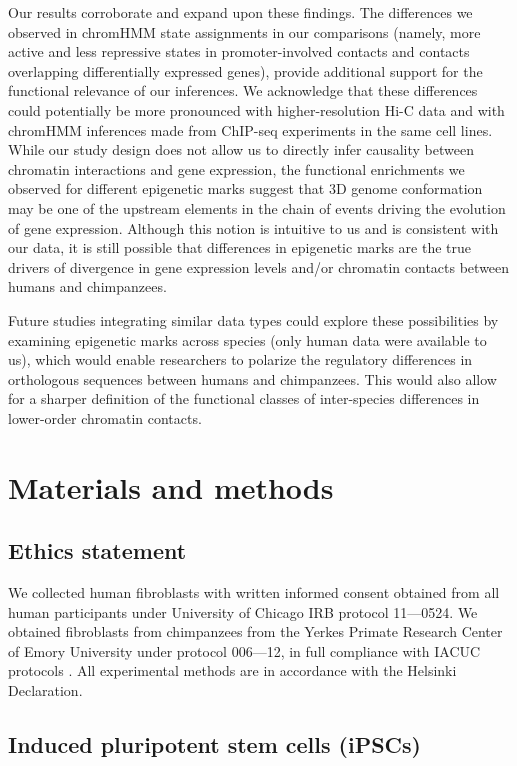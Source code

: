 Our results corroborate and expand upon these findings. The differences we observed in chromHMM state assignments in our comparisons (namely, more active and less repressive states in promoter-involved contacts and contacts overlapping differentially expressed genes), provide additional support for the functional relevance of our inferences. We acknowledge that these differences could potentially be more pronounced with higher-resolution Hi-C data and with chromHMM inferences made from ChIP-seq experiments in the same cell lines. While our study design does not allow us to directly infer causality between chromatin interactions and gene expression, the functional enrichments we observed for different epigenetic marks suggest that 3D genome conformation may be one of the upstream elements in the chain of events driving the evolution of gene expression. Although this notion is intuitive to us and is consistent with our data, it is still possible that differences in epigenetic marks are the true drivers of divergence in gene expression levels and/or chromatin contacts between humans and chimpanzees.

Future studies integrating similar data types could explore these possibilities by examining epigenetic marks across species (only human data were available to us), which would enable researchers to polarize the regulatory differences in orthologous sequences between humans and chimpanzees. This would also allow for a sharper definition of the functional classes of inter-species differences in lower-order chromatin contacts.

\section{Materials and methods}

\subsection{Ethics statement}

We collected human fibroblasts with written informed consent obtained from all human participants under University of Chicago IRB protocol 11---0524. We obtained fibroblasts from chimpanzees from the Yerkes Primate Research Center of Emory University under protocol 006---12, in full compliance with IACUC protocols \cite{Romero.2015}. All experimental methods are in accordance with the Helsinki Declaration.

\subsection{Induced pluripotent stem cells (iPSCs)}

